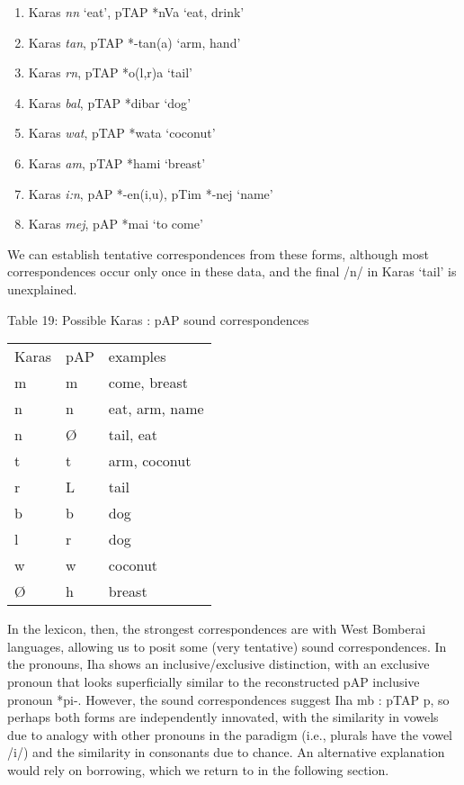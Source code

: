 \begin{enumerate}
\item Karas \textit{n}\textit{{\textsci}}\textit{n} {\textquoteleft}eat{\textquoteright}, pTAP *nVa {\textquoteleft}eat, drink{\textquoteright}
\item Karas \textit{tan}, pTAP *-tan(a) {\textquoteleft}arm, hand{\textquoteright}
\item Karas \textit{{\textopeno}}\textit{r}\textit{{\textupsilon}}\textit{n}, pTAP *o(l,r)a {\textquoteleft}tail{\textquoteright}
\item Karas \textit{bal}, pTAP *dibar {\textquoteleft}dog{\textquoteright}
\item Karas \textit{wat}, pTAP *wata {\textquoteleft}coconut{\textquoteright}
\item Karas \textit{am}, pTAP *hami {\textquoteleft}breast{\textquoteright}
\item Karas \textit{i:n}, pAP *-en(i,u), pTim *-nej {\textquoteleft}name{\textquoteright}
\item Karas \textit{mej}, pAP *mai {\textquoteleft}to come{\textquoteright}
\end{enumerate}
We can establish tentative correspondences from these forms, although most correspondences occur only once in these data, and the final /n/ in Karas {\textquoteleft}tail{\textquoteright} is unexplained. 

{\centering
Table 19: Possible Karas : pAP sound correspondences
\par}

\begin{center}
\tablehead{}
\begin{supertabular}{m{0.46015987in}m{0.36705986in}m{1.0531598in}}
Karas &
pAP &
examples\\
m &
m &
come, breast\\
n &
n &
eat, arm, name \\
n &
{\O} &
tail, eat\\
t &
t &
arm, coconut\\
r &
L &
tail\\
b &
b &
dog\\
l &
r &
dog\\
w &
w &
coconut\\
{\O} &
h &
breast\\
\end{supertabular}
\end{center}
In the lexicon, then, the strongest correspondences are with West Bomberai languages, allowing us to posit some (very tentative) sound correspondences. In the pronouns, Iha shows an inclusive/exclusive distinction, with an exclusive pronoun that looks superficially similar to the reconstructed pAP inclusive pronoun *pi-. However, the sound correspondences suggest Iha mb : pTAP p, so perhaps both forms are independently innovated, with the similarity in vowels due to analogy with other pronouns in the paradigm (i.e., plurals have the vowel /i/) and the similarity in consonants due to chance. An alternative explanation would rely on borrowing, which we return to in the following section. 

